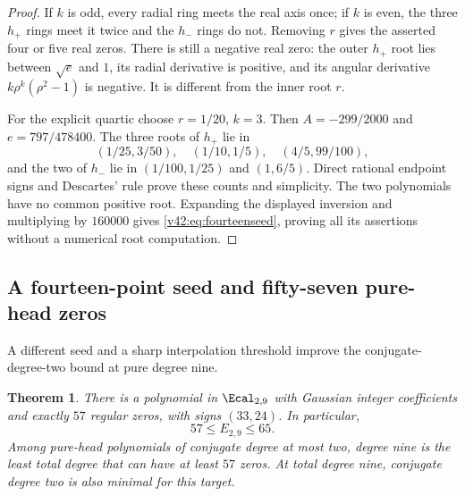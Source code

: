 \documentclass[UTF8,11pt]{ctexart}
\newtheorem{thm}{Theorem}[section]
\theoremstyle{definition}
\numberwithin{equation}{section}
\begin{document}
\begin{proof}
If $k$ is odd, every radial ring meets the real axis
once; if $k$ is even, the three $h_+$ rings meet it
twice and the $h_-$ rings do not. Removing $r$ gives
the asserted four or five real zeros. There is still
a negative real zero: the outer $h_+$ root lies between
$\sqrt e$ and $1$, its radial derivative is positive,
and its angular derivative $k\rho^k(\rho^2-1)$ is
negative. It is different from the inner root $r$.

For the explicit quartic choose $r=1/20$, $k=3$.
Then $A=-299/2000$ and $e=797/478400$.
The three roots of $h_+$ lie in
\[
 (1/25,3/50),\quad(1/10,1/5),\quad(4/5,99/100),
\]
and the two of $h_-$ lie in
$(1/100,1/25)$ and $(1,6/5)$.
Direct rational endpoint signs and Descartes' rule prove
these counts and simplicity. The two polynomials have no
common positive root. Expanding the displayed inversion
and multiplying by $160000$ gives
\eqref{v42:eq:fourteenseed}, proving all its assertions
without a numerical root computation.
\end{proof}

\subsection{A fourteen-point seed and fifty-seven pure-head zeros}
\label{v40:sec:57}

A different seed and a sharp interpolation threshold improve
the conjugate-degree-two bound at pure degree nine.

\begin{thm}\label{v40:thm:57}
There is a polynomial in $\Ecal_{2,9}$ with Gaussian integer
coefficients and exactly $57$ regular zeros, with signs $(33,24)$.
In particular,
\begin{equation}\label{v40:eq:bound}
                              57\le E_{2,9}\le65.
\end{equation}
Among pure-head polynomials of conjugate degree at most two,
degree nine is the least total degree that can have at least
$57$ zeros. At total degree nine, conjugate degree two is also
minimal for this target.
\end{thm}
\end{document}
